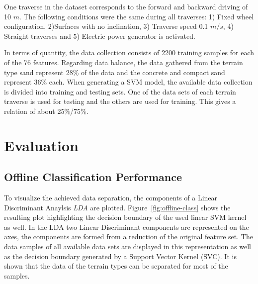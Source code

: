 \documentclass{article}
\begin{document}

One traverse in the dataset corresponds to the forward and backward driving of 10 $m$. The following conditions were the same during all traverses: 1) Fixed wheel configuration, 2)Surfaces with no inclination, 3) Traverse speed 0.1 $m/s$, 4) Straight traverses and 5) Electric power generator is activated.

In terms of quantity, the data collection consists of 2200 training samples for each of the 76 features. 
Regarding data balance, the data gathered from the terrain type sand represent 28\% of the data and the concrete and compact sand represent 36\% each. 
When generating a SVM model, the available data collection is divided into training and testing sets. One of the data sets of each terrain traverse is used for testing and the others are used for training. This gives a relation of about 25\%/75\%.

\section{Evaluation}
\subsection{Offline Classification Performance}

To visualize the achieved data separation, the components of a Linear Discriminant Anaylsis \emph{LDA} are plotted. 
Figure~\ref{fig:offline-class} shows the resulting plot highlighting the decision boundary of the used linear SVM kernel as well. In the LDA two Linear Discriminant components are represented on the axes, the components are formed from a reduction of the original feature set. The data samples of all available data sets are displayed in this representation as well as the decision boundary generated by a Support Vector Kernel (SVC). It is shown that the data of the terrain types can be separated for most of the samples.
\end{document}
